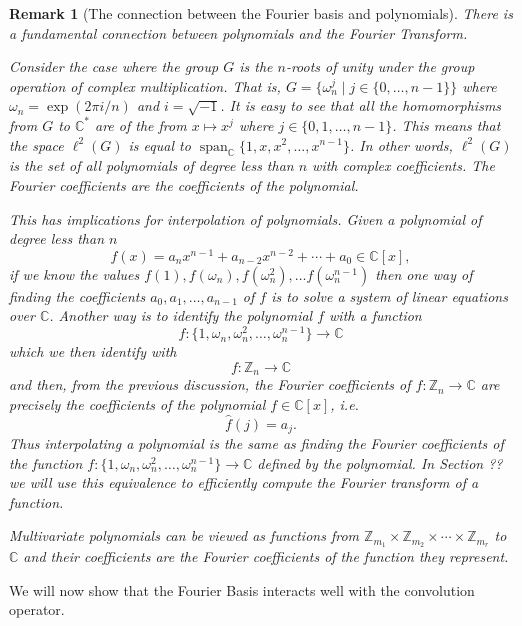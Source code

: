 \documentclass[12pt]{article}
\newtheorem{Remark}{Remark}
\newcommand{\noit}{\operatorname}
\newcommand{\Z}{\mathbb{Z}}
\newcommand{\C}{\mathbb{C}}
\newcommand{\Zm}{\Z_{m_1}\times \Z_{m_2} \times \cdots \times \Z_{m_r}}
\begin{document}
\begin{Remark}[The connection between the Fourier basis and polynomials]
    There is a fundamental connection between polynomials and the Fourier Transform.

    Consider the case where the group $G$ is the $n$-roots of unity under the group operation of complex multiplication.
    That is, $G = \{\omega_n^j\mid j\in \{0, \dots , n-1\}\}$ where $\omega_n = \exp(2\pi i /n)$ and $i=\sqrt{-1}$.
    It is easy to see that all the homomorphisms from $G$ to $\C^*$ are of the from $x\mapsto x^j$ where $j\in \{0, 1, \dots , n-1\}$.
    This means that the space $\ell^2(G)$ is equal to $\noit{span}_{\C}\{1, x, x^2, \dots , x^{n-1}\}$.
    In other words, $\ell^2(G)$ is the set of all polynomials of degree less than $n$ with complex coefficients.
    The Fourier coefficients are the coefficients of the polynomial.

    This has implications for interpolation of polynomials.
    Given a polynomial of degree less than $n$
    \[
        f(x) = a_nx^{n-1} + a_{n-2}x^{n-2} + \cdots + a_0 \in \C[x],
    \]
    if we know the values $f(1), f(\omega_n), f(\omega_n^2), \dots f(\omega_n^{n-1})$ then one way of finding the coefficients $a_0, a_1, \dots , a_{n-1}$ of $f$ is to solve a system of linear equations over $\C$.
    Another way is to identify the polynomial $f$ with a function
    \[
        f:\{1, \omega_n, \omega_n^2, \dots , \omega_n^{n-1}\} \to \C
    \]
    which we then identify with
    \[
        f:\Z_n \to \C
    \]
    and then, from the previous discussion, the Fourier coefficients of $f:\Z_n \to \C$ are precisely the coefficients of the polynomial $f\in \C[x]$, i.e.
    \[
        \widehat{f}(j) = a_j.
    \]
    Thus interpolating a polynomial is the same as finding the Fourier coefficients of the function $f:\{1, \omega_n, \omega_n^2, \dots, \omega_n^{n-1} \} \to \C$ defined by the polynomial.
    In Section ?? we will use this equivalence to efficiently compute the Fourier transform of a function.

    Multivariate polynomials can be viewed as functions from $\Zm$ to $\C$ and their coefficients are the Fourier coefficients of the function they represent.
\end{Remark}

We will now show that the Fourier Basis interacts well with the convolution operator.
\end{document}
